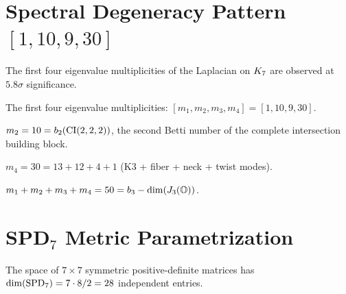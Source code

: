 \section{Spectral Degeneracy Pattern \texorpdfstring{$[1, 10, 9, 30]$}{[1, 10, 9, 30]}}

The first four eigenvalue multiplicities of the Laplacian on $K_7$
are observed at $5.8\sigma$ significance.

\begin{definition}\label{def:spectral_mult}
    \leanok
    The first four eigenvalue multiplicities:
    $[m_1, m_2, m_3, m_4] = [1, 10, 9, 30]$.
\end{definition}

\begin{theorem}[Topological Origin of $m_2 = 10$]\label{thm:mult2_CI222}
    \leanok
    $m_2 = 10 = b_2(\mathrm{CI}(2,2,2))$, the second Betti number
    of the complete intersection building block.
\end{theorem}

\begin{theorem}[Mode Decomposition of $m_4 = 30$]\label{thm:mult4_decomp}
    \leanok
    $m_4 = 30 = 13 + 12 + 4 + 1$ (K3 + fiber + neck + twist modes).
\end{theorem}

\begin{theorem}\label{thm:total_modes}
    \leanok
    $m_1 + m_2 + m_3 + m_4 = 50 = b_3 - \mathrm{dim}(J_3(\mathbb{O}))$.
\end{theorem}

\section{\texorpdfstring{SPD$_7$}{SPD7} Metric Parametrization}

\begin{definition}\label{def:spd7}
    \leanok
    The space of $7 \times 7$ symmetric positive-definite matrices has
    $\mathrm{dim}(\mathrm{SPD}_7) = 7 \cdot 8/2 = 28$ independent entries.
\end{definition}

